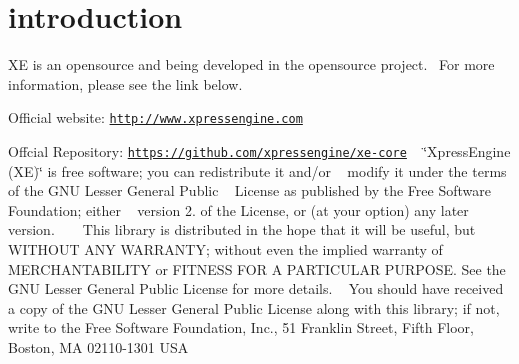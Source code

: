\hypertarget{index_intro}{}\section{introduction}\label{index_intro}
X\+E is an opensource and being developed in the opensource project.~\newline
For more information, please see the link below.
\begin{DoxyItemize}
\item Official website\+: \href{http://www.xpressengine.com}{\tt http\+://www.\+xpressengine.\+com}
\item Offcial Repository\+: \href{https://github.com/xpressengine/xe-core}{\tt https\+://github.\+com/xpressengine/xe-\/core} ~\newline
\char`\"{}\+Xpress\+Engine (\+X\+E)\char`\"{} is free software; you can redistribute it and/or ~\newline
modify it under the terms of the G\+N\+U Lesser General Public ~\newline
License as published by the Free Software Foundation; either ~\newline
version 2. of the License, or (at your option) any later version. ~\newline
~\newline
This library is distributed in the hope that it will be useful, but W\+I\+T\+H\+O\+U\+T A\+N\+Y W\+A\+R\+R\+A\+N\+T\+Y; without even the implied warranty of M\+E\+R\+C\+H\+A\+N\+T\+A\+B\+I\+L\+I\+T\+Y or F\+I\+T\+N\+E\+S\+S F\+O\+R A P\+A\+R\+T\+I\+C\+U\+L\+A\+R P\+U\+R\+P\+O\+S\+E. See the G\+N\+U Lesser General Public License for more details. ~\newline
You should have received a copy of the G\+N\+U Lesser General Public License along with this library; if not, write to the Free Software Foundation, Inc., 51 Franklin Street, Fifth Floor, Boston, M\+A 02110-\/1301 U\+S\+A 
\end{DoxyItemize}